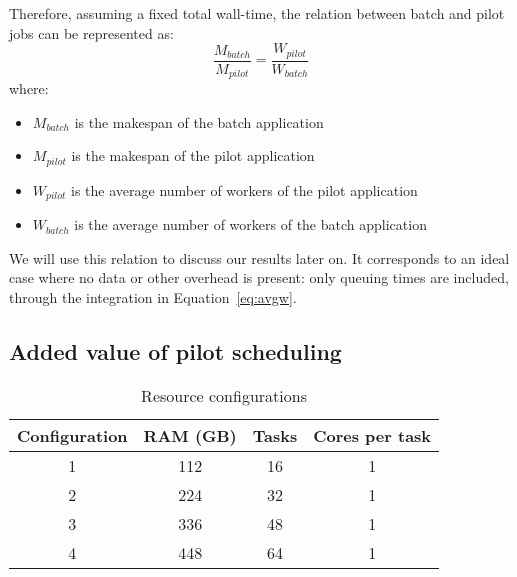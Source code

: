 \documentclass{IEEEtran}
\begin{document}
    Therefore, assuming a fixed total wall-time, the relation
    between batch and pilot jobs can be represented as:
    \begin{equation}
        \frac{M_{batch}}{M_{pilot}} = \frac{W_{pilot}}{W_{batch}}\label{eq:makespancomp}
    \end{equation}
    where:
    \begin{itemize}
        \item $M_{batch}$ is the makespan of the batch application
        \item $M_{pilot}$ is the makespan of the pilot application
        \item $W_{pilot}$ is the average number of workers of the pilot application
        \item $W_{batch}$ is the average number of workers of the batch application
    \end{itemize}
    We will use this relation to discuss our results later on. It
    corresponds to an ideal case where no data or other overhead is
    present: only queuing times are included, through the integration in
    Equation~\ref{eq:avgw}.

    \subsection{Added value of pilot scheduling}
        \begin{table}                                                                    
            \centering                                                                       
            \begin{tabular}{c|c|c|c}                                                             
            \rowcolor{headcolor}                                                             
            Configuration & RAM (GB) & Tasks & Cores per task\\                               
            \hline                                                                           
            1 & 112 & 16 & 1\\                                               
            2 & 224 & 32 & 1\\                                               
            3 & 336 & 48 & 1\\
            4 & 448 & 64 & 1\\
            \end{tabular}                                                                    
            \setlength{\belowcaptionskip}{-10pt}                                             
            \caption{Resource configurations}                                                    
            \label{table:dedicatednodes}                                                            
        \end{table} 
           
\end{document}
